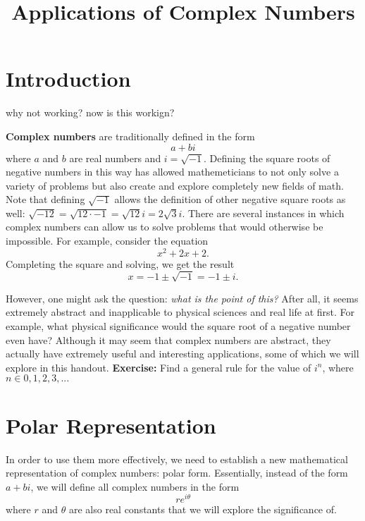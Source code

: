 \documentclass[12pt]{article}
\title{Applications of Complex Numbers}
\author{}
\date{}
\begin{document}
\maketitle

\tableofcontents

\section{Introduction}

why not working?
now is this workign?

\textbf{Complex numbers} are traditionally defined in the form \[ a + bi \] where $a$ and $b$ are real numbers and $i = \sqrt{-1}$. Defining the square roots of negative numbers in this way has allowed mathemeticians to not only solve a variety of problems but also create and explore completely new fields of math. Note that defining $\sqrt{-1}$ allows the definition of other negative square roots as well: $\sqrt{-12} = \sqrt{12 \cdot -1} = \sqrt{12}i = 2\sqrt{3}i$.
\newline\newline
There are several instances in which complex numbers can allow us to solve problems that would otherwise be impossible. For example, consider the equation \[ x^2 + 2x + 2. \] Completing the square and solving, we get the result \[ x = -1 \pm \sqrt{-1} = -1 \pm i. \] 


However, one might ask the question: \textit{what is the point of this?} After all, it seems extremely abstract and inapplicable to physical sciences and real life at first. For example, what physical significance would the square root of a negative number even have? Although it may seem that complex numbers are abstract, they actually have extremely useful and interesting applications, some of which we will explore in this handout. 
\newline\newline
\textbf{Exercise:} Find a general rule for the value of $i^n$, where $n \in {0, 1, 2, 3, ...}$

\section{Polar Representation}

In order to use them more effectively, we need to establish a new mathematical representation of complex numbers: polar form. Essentially, instead of the form $a + bi$, we will define all complex numbers in the form \[re^{i\theta}\] where $r$ and $\theta$ are also real constants that we will explore the significance of.
\end{document}
